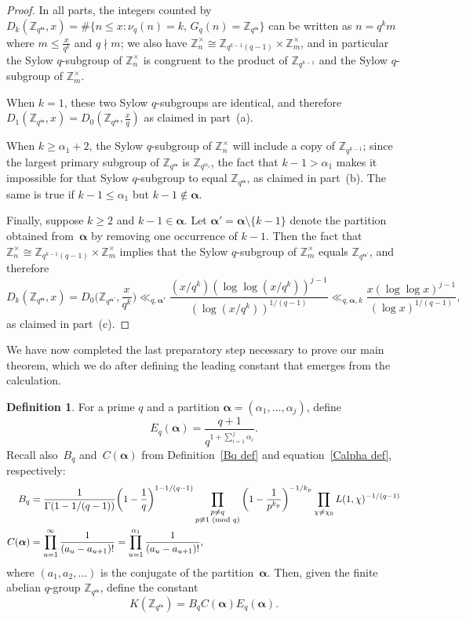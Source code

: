 \documentclass[12pt,reqno]{amsart}
\theoremstyle{definition}
\newtheorem{definition}[theorem]{Definition}
\newcommand{\Z}{{\mathbb Z}}
\newcommand{\balpha}{{\bm\alpha}}
\renewcommand{\mod}[1]{{\ifmmode\text{\rm\ (mod~$#1$)}\else\discretionary{}{}{\hbox{ }}\rm(mod~$#1$)\fi}}
\begin{document}
\begin{proof}
In all parts, the integers counted by $D_k(\Z_{q^\balpha},x) = \#\{n\le x \colon \nu_q(n)=k,\, G_q(n)=\Z_{q^\balpha}\}$ can be written as $n=q^km$ where $m\le \frac x{q^k}$ and $q\nmid m$; we also have $\Z_n^\times \cong \Z_{q^{k-1}(q-1)} \times \Z_m^\times$, and in particular the Sylow $q$-subgroup of $\Z_n^\times$ is congruent to the product of $\Z_{q^{k-1}}$ and the Sylow $q$-subgroup of $\Z_m^\times$.

When $k=1$, these two Sylow $q$-subgroups are identical, and therefore $D_1(\Z_{q^\balpha},x) = D_0(\Z_{q^\balpha},\frac xq)$ as claimed in part~(a).

When $k\ge\alpha_1+2$, the Sylow $q$-subgroup of $\Z_n^\times$ will include a copy of $\Z_{q^{k-1}}$; since the largest primary subgroup of $\Z_{q^\balpha}$ is $\Z_{q^{\alpha_1}}$, the fact that $k-1>\alpha_1$ makes it impossible for that Sylow $q$-subgroup to equal $\Z_{q^\balpha}$, as claimed in part~(b). The same is true if $k-1\le\alpha_1$ but $k-1\notin\balpha$.

Finally, suppose $k\ge2$ and $k-1\in\balpha$. Let $\balpha'=\balpha\setminus\{k-1\}$ denote the partition obtained from~$\balpha$ by removing one occurrence of $k-1$. Then the fact that $\Z_n^\times \cong \Z_{q^{k-1}(q-1)} \times \Z_m^\times$ implies that the Sylow $q$-subgroup of $\Z_m^\times$ equals $\Z_{q^{\balpha'}}$, and therefore
\[
D_k(\Z_{q^\balpha},x) = D_0\bigg( \Z_{q^{\balpha'}}, \frac x{q^k} \bigg) \ll_{q,\balpha'} \frac{(x/q^k)(\log\log (x/q^k))^{j-1}}{(\log (x/q^k))^{1/(q-1)}} \ll_{q,\balpha,k} \frac{x(\log\log x)^{j-1}}{(\log x)^{1/(q-1)}},
\]
as claimed in part~(c).
\end{proof}

We have now completed the last preparatory step necessary to prove our main theorem, which we do after defining the leading constant that emerges from the calculation.

\begin{definition} \label{Eqalpha def}
For a prime $q$ and a partition $\balpha=(\alpha_1,\dots,\alpha_j)$, define
\[
E_q(\balpha)=\frac{q+1}{q^{1+\sum_{i=1}^j \alpha_i}}.
\]
Recall also~$B_q$ and~$C(\balpha)$ from Definition~\ref{Bq def} and equation~\eqref{Calpha def}, respectively:
\begin{align*}
B_q &= \frac{1}{\Gamma(1-1/(q-1))}\bigg(1-\frac1q \bigg)^{1-1/(q-1)}\prod_{\substack{p\ne q\\ p\not\equiv 1 \mod q}} \bigg(1-\frac1{p^{k_p}} \bigg)^{-1/k_p}\prod_{\chi\ne \chi_0}L(1,\chi)^{-1/(q-1)} \\
C(\balpha) &= \prod_{u=1}^\infty \frac1{(a_u-a_{u+1})!} = \prod_{u=1}^{\alpha_1} \frac1{(a_u-a_{u+1})!},
\end{align*}
where $(a_1,a_2,\dots)$ is the conjugate of the partition~$\balpha$.
Then, given the finite abelian $q$-group $\Z_{q^\balpha}$, define the constant
\[
K(\Z_{q^\balpha})=B_qC(\balpha)E_q(\balpha).
\]
\end{definition}
\end{document}
